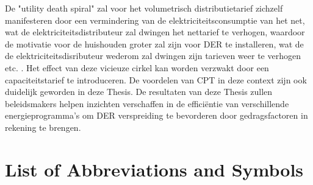 \documentclass[master=ene,english]{kulemt}
\begin{document}
\begin{abstract*}
 \newline \noindent
De "utility death spiral" zal voor het volumetrisch distributietarief zichzelf manifesteren door een vermindering van de elektriciteitsconsumptie van het net, wat de elektriciteitsdistributeur zal dwingen het nettarief te verhogen, waardoor de motivatie voor de huishouden groter zal zijn voor DER te installeren, wat de de elektriciteitsdisributeur wederom zal dwingen zijn tarieven weer te verhogen etc. . Het effect van deze vicieuze cirkel kan worden verzwakt door een capaciteitstarief te introduceren. De voordelen van CPT in deze context zijn ook duidelijk geworden in deze Thesis.
\newline \noindent
De resultaten van deze Thesis zullen beleidsmakers helpen inzichten verschaffen in de effici\"{e}ntie van verschillende energieprogramma's om DER verspreiding te bevorderen door gedragsfactoren in rekening te brengen. 
\end{abstract*}	

\listoffiguresandtables
\chapter{List of Abbreviations and Symbols}
\end{document}
